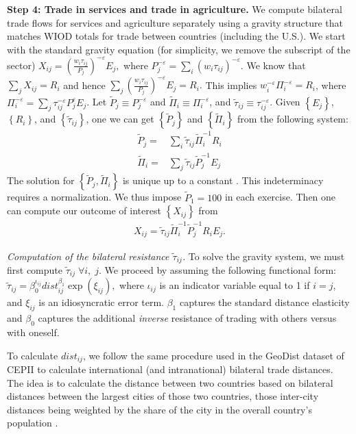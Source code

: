 \documentclass[12pt]{article}
\newcommand{\bq}{\begin{eqnarray}}
\newcommand{\eq}{\end{eqnarray}}
\begin{document}
\textbf{Step 4: Trade in services and trade in agriculture.} We compute bilateral trade flows for services and agriculture separately using a gravity structure that matches WIOD totals for trade between countries (including the U.S.). We start with the standard gravity equation (for simplicity, we remove the subscript of the sector) $X_{ij}=\left(\tfrac{w_{i}\tau_{ij}}{P_{j}}\right)^{-\varepsilon}E_{j},$
where $P_{j}^{-\varepsilon}=\sum_{i}\left(w_{i}\tau_{ij}\right)^{-\varepsilon}$. We know that $\sum_{j}X_{ij}=R_{i}$ and hence $\sum_{j}\left(\frac{w_{i}\tau_{ij}}{P_{j}} \right)^{-\varepsilon}E_{j}=R_{i}.$ This implies $w_{i}^{-\varepsilon} \Pi_{i}^{-\varepsilon}=R_{i}$, where $\Pi_{i}^{-\varepsilon}= \sum_{j} \tau_{ij}^{ -\varepsilon}P_{j}^{\varepsilon}E_{j}$. Let $\tilde{P}_{j}\equiv P_{j}^{-\varepsilon}$ and $\tilde{\Pi}_{i}\equiv \Pi_{i}^{-\varepsilon}$, and $\tilde{\tau}_{ij}\equiv\tau_{ij}^{-\varepsilon}$. Given $\left\{ E_{j}\right\}$,  $\left\{ R_{i}\right\}$,  and $\left\{ \tilde{\tau}_{ij}\right\}$, one we can get $\left\{ \tilde{P}_{j}\right\}$  and $\left\{ \tilde{\Pi}_{i}\right\}$ from the following system:
\begin{align}
\tilde{P}_{j}=&\sum_{i}\tilde{\tau}_{ij}\tilde{\Pi}_{i}^{-1}R_{i} \nonumber \\  \tilde{\Pi}_{i}=&\sum_{j}\tilde{\tau}_{ij}\tilde{P}_{j}^{-1}E_{j} \label{eq:grav_system_gen}
\end{align}
The solution for $\left\{ \tilde{P}_{j}, \tilde{\Pi}_{i} \right\}$ is unique up to a constant \citep{fally2015structural}. This indeterminacy requires a normalization. We thus impose $\tilde{P}_{1}=100$ in each exercise. Then one can compute our outcome of interest $\left\{ X_{ij}\right\}$  from
\bq
X_{ij}=\tilde{\tau}_{ij}\tilde{\Pi}_{i}^{-1}\tilde{P}_{j}^{-1}R_{i}E_{j}. \label{eq:grav_bilat}
\eq

\noindent \textit{{Computation of the bilateral resistance $\tilde{\tau}_{ij}$.}} To solve the gravity system, we must first compute $\tilde{\tau}_{ij}\; \forall i,\;j$. We proceed by assuming the following functional form: $\tilde{\tau}_{ij}=\beta_{0}^{\iota_{ij}}dist_{ij}^{\beta_{1}}\exp\left(\xi_{ij}\right),$ where $\iota_{ij}$ is an indicator variable equal to 1 if $i=j$, and $\xi_{ij}$ is an idiosyncratic error term. $\beta_{1}$ captures the standard distance elasticity and $\beta_{0}$ captures the additional \textit{inverse} resistance of trading with others versus with oneself. 

To calculate $dist_{ij}$, we follow the same procedure used in the GeoDist dataset of CEPII to calculate international (and intranational) bilateral trade distances. The idea is to calculate the distance between two countries based on bilateral distances between the largest cities of those two countries, those inter-city distances being weighted by the share of the city in the overall country's population \citep{head2002illusory}.
\end{document}
